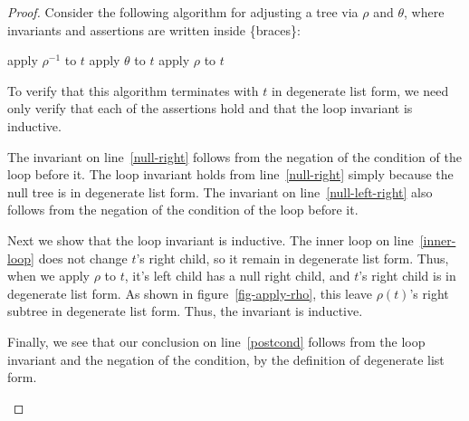 \documentclass{llncs}
\begin{document}
\begin{proof}
    Consider the following algorithm for adjusting a tree via $\rho$ and $\theta$,
    where invariants and assertions are written inside \{braces\}:
    \begin{algorithm}[H]
      \begin{algorithmic}[1]
            \State apply $\rho^{-1}$ to $t$
          \EndWhile
           \label{null-right}
            \label{inner-loop}
              \State apply $\theta$ to $t$
            \EndWhile
              \label{null-left-right}
            \State apply $\rho$ to $t$ \label{apply-rho}
          \EndWhile
           \label{postcond}
        \EndFunction
      \end{algorithmic}
    \end{algorithm} 


    To verify that this algorithm terminates with $t$ in degenerate list form,
    we need only verify that each of the assertions hold and that the loop
    invariant is inductive.

    The invariant on line~\ref{null-right} follows from the negation of the
    condition of the loop before it.
    The loop invariant holds from line~\ref{null-right} simply because the null
    tree is in degenerate list form.
    The invariant on line~\ref{null-left-right} also follows from the negation of
    the condition of the loop before it.

    Next we show that the loop invariant is inductive.
    The inner loop on line~\ref{inner-loop} does not change $t$'s right child,
    so it remain in degenerate list form.
    Thus, when we apply $\rho$ to $t$, it's left child has a null right child, and
    $t$'s right child is in degenerate list form.
    As shown in figure~\ref{fig-apply-rho}, this leave $\rho(t)$'s right subtree
    in degenerate list form. 
    Thus, the invariant is inductive.

    Finally, we see that our conclusion on line~\ref{postcond} follows from the
    loop invariant and the negation of the condition, by the definition of
    degenerate list form.
    \begin{figure}
        \centering


\end{figure}
\end{proof}
\end{document}
